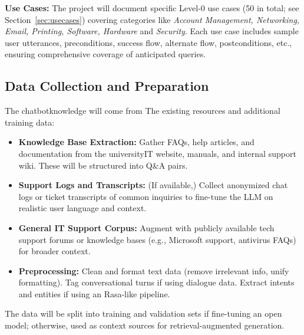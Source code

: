 \documentclass{article.cls}
\begin{document}
    \textbf{Use Cases:} The project will document specific Level-0 use cases (50 in total; see Section~\ref{sec:usecases}) covering categories like \textit{Account Management, Networking, Email, Printing, Software, Hardware} and \textit{Security}. Each use case includes sample user utterances, preconditions, success flow, alternate flow, postconditions, etc., ensuring comprehensive coverage of anticipated queries.

    \subsection{Data Collection and Preparation}
    The chatbot\rqs knowledge will come from The existing resources and additional training data:
    \begin{itemize}
        \item \textbf{Knowledge Base Extraction:} Gather FAQs, help articles, and documentation from the university\rqs IT website, manuals, and internal support wiki.
        These will be structured into Q\&A pairs.
        \item \textbf{Support Logs and Transcripts:} (If available,) Collect anonymized chat logs or ticket transcripts of common inquiries to fine-tune the LLM on realistic user language and context.
        \item \textbf{General IT Support Corpus:} Augment with publicly available tech support forums or knowledge bases (e.g., Microsoft support, antivirus FAQs) for broader context.
        \item \textbf{Preprocessing:} Clean and format text data (remove irrelevant info, unify formatting). Tag conversational turns if using dialogue data. Extract intents and entities if using an Rasa-like pipeline.
    \end{itemize}
    The data will be split into training and validation sets if fine-tuning an open model; otherwise, used as context sources for retrieval-augmented generation.
\end{document}
